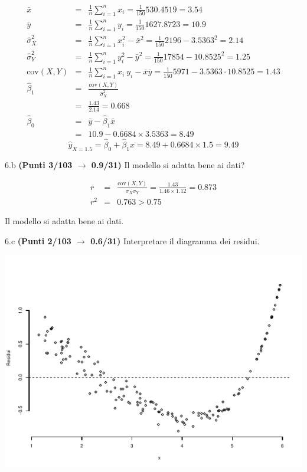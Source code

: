 \documentclass[
  11pt,
]{book}
\theoremstyle{mytheoremstyle}
\theoremstyle{mydefstyle}
\newenvironment{sol}
  {
  \begin{tcolorbox}[enhanced,breakable,arc=0.1mm,boxrule=1pt,colback=white,colframe=iblue,
  title=\bf \fontfamily{lmss}\selectfont \hspace{.5 cm} Soluzione,drop fuzzy shadow]

}{
\end{tcolorbox}
  }
\begin{document}
\begin{sol}
\begin{eqnarray*}
           \bar x &=&\frac 1 n\sum_{i=1}^n x_i = \frac {1}{ 150 }  530.4519 =  3.54 \\
           \bar y &=&\frac 1 n\sum_{i=1}^n y_i = \frac {1}{ 150 }  1627.8723 =  10.9 \\
           \hat\sigma_X^2&=&\frac 1 n\sum_{i=1}^n x_i^2-\bar x^2=\frac {1}{ 150 }  2196  - 3.5363 ^2= 2.14 \\
           \hat\sigma_Y^2&=&\frac 1 n\sum_{i=1}^n y_i^2-\bar y^2=\frac {1}{ 150 }  17854  - 10.8525 ^2= 1.25 \\
           \text{cov}(X,Y)&=&\frac 1 n\sum_{i=1}^n x_i~y_i-\bar x\bar y=\frac {1}{ 150 }  5971 - 3.5363 \cdot 10.8525 = 1.43 \\
           \hat\beta_1 &=& \frac{\text{cov}(X,Y)}{\hat\sigma_X^2} \\
                    &=& \frac{ 1.43 }{ 2.14 }  =  0.668 \\
           \hat\beta_0 &=& \bar y - \hat\beta_1 \bar x\\
                    &=&  10.9 - 0.6684 \times  3.5363 = 8.49 
         \end{eqnarray*}\[\hat y_{X= 1.5 }=\hat\beta_0+\hat\beta_1 x= 8.49 + 0.6684 \times 1.5 = 9.49 \]

\end{sol}

6.b \textbf{(Punti 3/103 \(\rightarrow\) 0.9/31)} Il modello si adatta bene ai dati?

\begin{sol}
\begin{eqnarray*}
r&=&\frac{\text{cov}(X,Y)}{\sigma_X\sigma_Y}=\frac{ 1.43 }{ 1.46 \times 1.12 }= 0.873 \\ 
r^2&=& 0.763 > 0.75
\end{eqnarray*}

Il modello si adatta bene ai dati.

\end{sol}

6.c \textbf{(Punti 2/103 \(\rightarrow\) 0.6/31)} Interpretare il diagramma dei residui.

\begin{center}\includegraphics{Esami_passati_con_soluzioni_files/figure-latex/2023-25,-1} \end{center}
\end{document}
